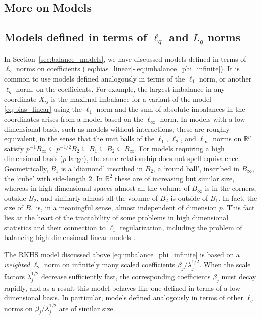 \documentclass{article}
\theoremstyle{definition}
\newcommand{\R}{\ensuremath{\mathbb{R}}}
\newcommand{\<}{\langle}
\renewcommand{\>}{\rangle}
\begin{document}
\begin{refsection}
\section{More on Models}
\label{sec:more-on-models}


\subsection{Models defined in terms of $\ell_q$ and $L_q$ norms}
\label{sec:lq-models}
In Section~\ref{sec:balance_models}, we have discussed models defined in terms of $\ell_2$ norms on coefficients (\ref{eq:bias_linear}-\ref{eq:imbalance_phi_infinite}). It is common to use models defined analogously in terms of the $\ell_1$ norm, or another $\ell_q$ norm, on the coefficients. For example, the
largest imbalance in any coordinate $X_{ij}$ is the maximal imbalance for a variant of the model \eqref{eq:bias_linear} using the $\ell_1$ norm and
the sum of absolute imbalances in the coordinates arises from a model based on the $\ell_{\infty}$ norm.
In models with a low-dimensional basis, such as models without interactions, these are roughly equivalent, in the sense that the unit balls of the $\ell_1$, $\ell_2$, and $\ell_{\infty}$ norms on $\R^p$ satisfy $p^{-1} B_{\infty} \subseteq p^{-1/2} B_2 \subseteq B_1 \subseteq B_2 \subseteq B_{\infty}$.
For models requiring a high dimensional basis ($p$ large), the same relationship does not spell equivalence. Geometrically, $B_1$ is a `diamond' inscribed in $B_2$, a `round ball', inscribed in $B_{\infty}$,
the `cube' with side-length $2$. In $\R^2$ these are of increasing but similar size, whereas in high dimensional spaces almost all the volume of $B_{\infty}$ is in the corners, outside $B_2$, and similarly almost all the volume of $B_2$ is outside of $B_1$. In fact, the size of $B_1$ is, in a meaningful sense, almost independent of dimension $p$. This fact lies at the heart of the tractability of some problems in high dimensional statistics and their connection to $\ell_1$ regularization, including the problem of balancing high dimensional linear models \citep[e.g.,][]{athey2018approximate, tan2020regularized}.

The RKHS model discussed above \eqref{eq:imbalance_phi_infinite} is based on a \emph{weighted} $\ell_2$ norm on infinitely many scaled coefficients $\beta_j / \lambda_j^{1/2}$.
When the scale factors $\lambda_j^{1/2}$ decrease sufficiently fast, the corresponding coefficients $\beta_j$ must decay rapidly, and as a result this model behaves like one defined in terms of a low-dimensional basis. In particular, models defined analogously in terms of other $\ell_q$ norms on $\beta_j / \lambda_j^{1/2}$ are of similar size.


\end{refsection}
\end{document}
